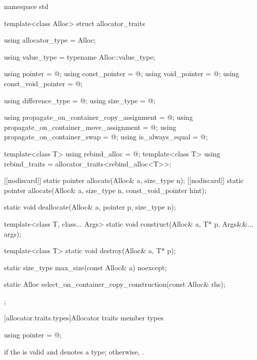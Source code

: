 %
\begin{codeblock}
namespace std {
  template<class Alloc> struct allocator_traits {
    using allocator_type     = Alloc;

    using value_type         = typename Alloc::value_type;

    using pointer            = @\seebelow@;
    using const_pointer      = @\seebelow@;
    using void_pointer       = @\seebelow@;
    using const_void_pointer = @\seebelow@;

    using difference_type    = @\seebelow@;
    using size_type          = @\seebelow@;

    using propagate_on_container_copy_assignment = @\seebelow@;
    using propagate_on_container_move_assignment = @\seebelow@;
    using propagate_on_container_swap            = @\seebelow@;
    using is_always_equal                        = @\seebelow@;

    template<class T> using rebind_alloc = @\seebelow@;
    template<class T> using rebind_traits = allocator_traits<rebind_alloc<T>>;

    [[nodiscard]] static pointer allocate(Alloc& a, size_type n);
    [[nodiscard]] static pointer allocate(Alloc& a, size_type n, const_void_pointer hint);

    static void deallocate(Alloc& a, pointer p, size_type n);

    template<class T, class... Args>
      static void construct(Alloc& a, T* p, Args&&... args);

    template<class T>
      static void destroy(Alloc& a, T* p);

    static size_type max_size(const Alloc& a) noexcept;

    static Alloc select_on_container_copy_construction(const Alloc& rhs);
  };
}
\end{codeblock}

[allocator.traits.types]{Allocator traits member types}

%
\begin{itemdecl}
using pointer = @\seebelow@;
\end{itemdecl}

\begin{itemdescr}
\pnum
\ctype {} if
the   is valid and denotes a
type; otherwise, .
\end{itemdescr}

